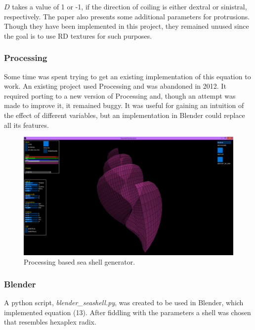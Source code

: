 \documentclass[a4paper]{article}
\begin{document}
$D$ takes a value of 1 or -1, if the direction of coiling is either dextral or sinistral, respectively. The paper also presents some additional parameters for protrusions. Though they have been implemented in this project, they remained unused since the goal is to use RD textures for such purposes.

\pagebreak

\subsubsection{Processing}
	
Some time was spent trying to get an existing implementation of this equation to work. An existing project used Processing and was abandoned in 2012. It required porting to a new version of Processing and, though an attempt was made to improve it, it remained buggy. It was useful for gaining an intuition of the effect of different variables, but an implementation in Blender could replace all its features.
	
\begin{figure}[h]
	
	\centering\includegraphics[scale=0.3]{./img/seashell_generator.png}
	\caption{Processing based sea shell generator.}
	\label{activator-inhibitor} %
\end{figure}

\subsubsection{Blender}

A python script, \textit{blender\_seashell.py},  was created to be used in Blender, which implemented equation (13). After fiddling with the parameters a shell was chosen that resembles hexaplex radix.
\end{document}

